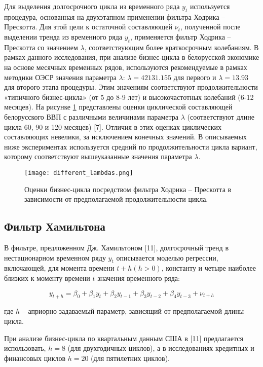 \documentclass[a4paper,14pt]{extreport}
\begin{document}
	Для выделения долгосрочного цикла из временного ряда $y_t$ используется процедура, основанная на двухэтапном применении фильтра Ходрика – Прескотта. Для этой цели к остаточной составляющей $\nu_t$, полученной после выделении тренда из временного ряда $y_t$, применяется фильтр Ходрика – Прескотта со значением $\lambda$, соответствующим более краткосрочным колебаниям. В рамках данного исследования, при анализе бизнес-цикла в белорусской экономике на основе месячных временных рядов,  используются рекомендуемые в рамках методики ОЭСР значения параметра $\lambda$:  $\lambda = 42131.155$ для первого и $\lambda = 13.93$ для второго этапа процедуры. Этим значениям соответствуют продолжительности «типичного бизнес-цикла» (от 5 до 8-9 лет) и высокочастотных колебаний (6-12 месяцев). На рисунке \ref{fig:different_lambda} представлены оценки циклической составляющей белорусского ВВП с различными величинами параметра $\lambda$ (соответствуют длине цикла 60, 90 и 120 месяцев) [7]. Отличия в этих оценках циклических составляющих невелики, за исключением конечных значений.  В описываемых ниже экспериментах используется средний по продолжительности цикла вариант, которому соответствуют вышеуказанные значения параметра $\lambda$.
	
	\begin{figure}
		\label{fig:different_lambda}
		\texttt{[image: different\_lambdas.png]}
		\caption{Оценки бизнес-цикла посредством фильтра Ходрика – Прескотта в зависимости от предполагаемой продолжительности цикла.}
	\end{figure} 	
	
	\subsection{Фильтр Хамильтона}
	
	В фильтре, предложенном Дж. Хамильтоном [11], долгосрочный тренд в нестационарном временном ряду $y_t$ описывается моделью регрессии, включающей, для момента времени $t+h (h>0)$, константу и четыре наиболее близких к моменту времени $t$ значения временного ряда: 
	
	\begin{equation}
		y_{t+h} = \beta_0 + \beta_1 y_t + \beta_2 y_{t-1} 
		+ \beta_3 y_{t-2} + \beta_4 y_{t-3} + \nu_{t+h}
		\label{eq:ham_filter}
	\end{equation}
	
	где $h$ – априорно задаваемый параметр, зависящий от предполагаемой длины цикла. 
	
	При анализе бизнес-цикла по квартальным данным США в [11] предлагается использовать, $h=8$ (для двухгодичных циклов), а в исследованиях кредитных и финансовых циклов $h=20$ (для пятилетних циклов).
	
\end{document}
